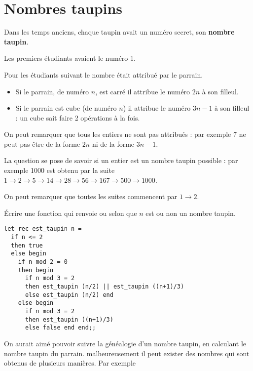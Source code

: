 \section{Nombres taupins} 
Dans les temps anciens, chaque taupin avait un numéro secret, son {\bf nombre taupin}.

Les premiers étudiants avaient le numéro 1.

Pour les étudiants suivant le nombre était attribué par le parrain.
\begin{itemize}
    \item Si le parrain, de numéro $n$, est carré il attribue le numéro $2n$ à son filleul.
    \item Si le parrain est cube (de numéro $n$) il attribue le numéro $3n - 1$ à son filleul : un cube sait faire 2 opérations à la fois.
\end{itemize}

On peut remarquer que tous les entiers ne sont pas attribués : par exemple 7 ne peut pas être de la forme $2n$ ni de la forme $3n - 1$.

La question se pose de savoir si un entier est un nombre taupin possible : par exemple 1000 est obtenu par la suite
$1 \rightarrow 2 \rightarrow 5 \rightarrow 14 \rightarrow 28 \rightarrow 56 \rightarrow 167  \rightarrow 500  \rightarrow 1000$.


On peut remarquer que toutes les suites commencent par $1\rightarrow 2$.

\begin{Exercise}[title=Test de taupinalité]
Écrire une fonction  qui renvoie  ou  selon que $n$ est ou non un nombre taupin.
\end{Exercise}
\begin{Answer}
\begin{lstlisting}
let rec est_taupin n =
  if n <= 2
  then true
  else begin
    if n mod 2 = 0
    then begin
      if n mod 3 = 2 
      then est_taupin (n/2) || est_taupin ((n+1)/3)
      else est_taupin (n/2) end
    else begin
      if n mod 3 = 2
      then est_taupin ((n+1)/3)
      else false end end;;           
\end{lstlisting}
\newpage
\end{Answer}
\medskip
On aurait aimé pouvoir suivre la généalogie d'un nombre taupin, en calculant le nombre taupin du parrain. malheureusement il peut exister des nombres qui sont obtenus de plusieurs manières. Par exemple

